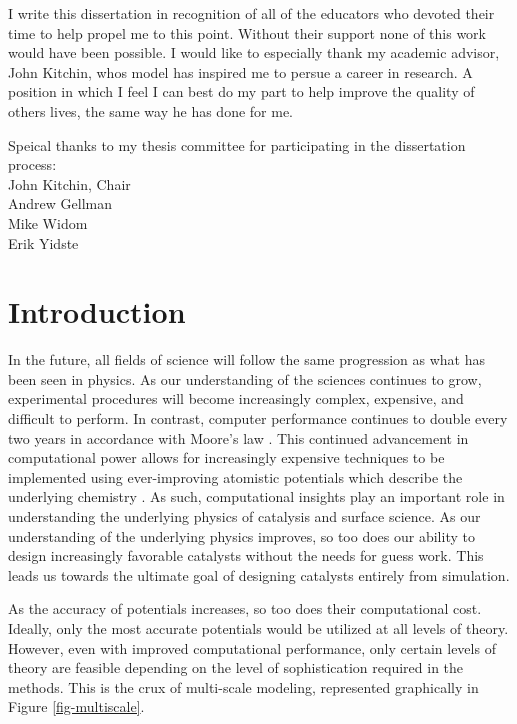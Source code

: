 \documentclass[12pt]{cmuthesis}
\begin{document}
\begin{acknowledgments}
I write this dissertation in recognition of all of the educators who devoted their time to help propel me to this point. Without their support none of this work would have been possible. I would like to especially thank my academic advisor, John Kitchin, whos model has inspired me to persue a career in research. A position in which I feel I can best do my part to help improve the quality of others lives, the same way he has done for me.

Speical thanks to my thesis committee for participating in the dissertation process: \\
John Kitchin, Chair \\
Andrew Gellman \\
Mike Widom \\
Erik Yidste
\end{acknowledgments}

\tableofcontents
\listoftables
\listoffigures

\mainmatter
\renewcommand{\baselinestretch}{1.66}\normalsize

\chapter{Introduction}
\label{sec:ch0}
In the future, all fields of science will follow the same progression as what has been seen in physics. As our understanding of the sciences continues to grow, experimental procedures will become increasingly complex, expensive, and difficult to perform. In contrast, computer performance continues to double every two years in accordance with Moore's law \cite{schaller-1997-moores-law}. This continued advancement in computational power allows for increasingly expensive techniques to be implemented using ever-improving atomistic potentials which describe the underlying chemistry \cite{boes-2016-neural-networ,perdew-2005-presc-desig}. As such, computational insights play an important role in understanding the underlying physics of catalysis and surface science. As our understanding of the underlying physics improves, so too does our ability to design increasingly favorable catalysts without the needs for guess work. This leads us towards the ultimate goal of designing catalysts entirely from simulation.

As the accuracy of potentials increases, so too does their computational cost. Ideally, only the most accurate potentials would be utilized at all levels of theory. However, even with improved computational performance, only certain levels of theory are feasible depending on the level of sophistication required in the methods. This is the crux of multi-scale modeling, represented graphically in Figure \ref{fig-multiscale}.
\end{document}
